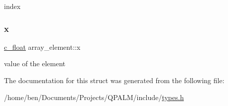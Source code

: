 index 

\mbox{\label{structarray__element_a7f98237eb20c339e84d18f056876c620}} 
\subsubsection{\texorpdfstring{x}{x}}
{\footnotesize\ttfamily \mbox{\hyperlink{global__opts_8h_a7f1a9fda95e52979658c20a0d134fb15}{c\+\_\+float}} array\+\_\+element\+::x}



value of the element 



The documentation for this struct was generated from the following file\+:\begin{DoxyCompactItemize}
\item 
/home/ben/\+Documents/\+Projects/\+Q\+P\+A\+L\+M/include/\mbox{\hyperlink{types_8h}{types.\+h}}\end{DoxyCompactItemize}
